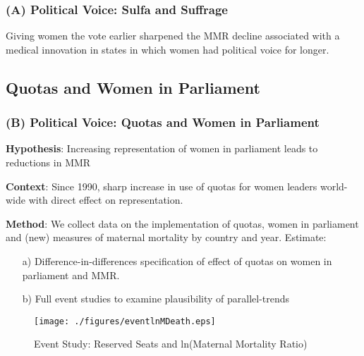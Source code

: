 \documentclass[10pt,letterpaper,subeqn]{beamer}
\begin{document}
\begin{frame}
\frametitle{(A) Political Voice: Sulfa and Suffrage}
Giving women the vote earlier sharpened the MMR decline associated with a medical innovation in  states in which women had political voice for longer.
\end{frame}


\subsection{Quotas and Women in Parliament}
\begin{frame}[label=Quotas]
\frametitle{(B) Political Voice: Quotas and Women in Parliament}
\textbf{Hypothesis}: Increasing representation of women in parliament leads to
reductions in MMR \\
\vspace{3mm}

\textbf{Context}: Since 1990, sharp increase in use of quotas for women leaders
world-wide with direct effect on representation. \\
\vspace{3mm}

\textbf{Method}: We collect data on the implementation of quotas, women in
parliament and (new) measures of maternal mortality by country and year. Estimate:
\begin{enumerate}
\item[a)] Difference-in-differences specification of effect of quotas on women
  in parliament and MMR.

\item[b)] Full event studies to examine plausibility of parallel-trends
\end{enumerate}
\end{frame}



\begin{frame}[label=quotaMMR]
  \begin{figure}
    \caption{Event Study: Reserved Seats and ln(Maternal Mortality Ratio)}
    \texttt{[image: ./figures/eventlnMDeath.eps]}
  \end{figure}
\end{frame}
\end{document}
